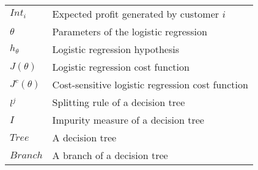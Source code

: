 \begin{tabularx}{\textwidth}{ l X }
$Int_i$ & Expected profit generated by customer $i$ \\
$\theta$ & Parameters of the logistic regression \\
$h_\theta $ & Logistic regression hypothesis \\
$J(\theta) $ & Logistic regression cost function \\
$J^c(\theta) $ & Cost-sensitive logistic regression cost function \\
$l^j$ & Splitting rule of a decision tree \\
$I$ & Impurity measure of a decision tree \\
$Tree$ & A decision tree \\
$Branch$& A branch of a decision tree \\
\end{tabularx}
